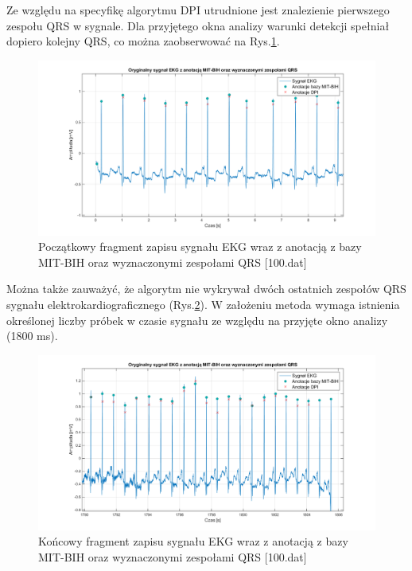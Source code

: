 \documentclass[10pt,a4paper]{article}
\begin{document}
Ze względu na specyfikę algorytmu DPI utrudnione jest znalezienie pierwszego zespołu QRS w sygnale. Dla przyjętego okna analizy warunki detekcji spełniał dopiero kolejny QRS, co można zaobserwować na Rys.\ref{beginning}. 
\begin{figure}[h]
    \centering
    \includegraphics[width=1\textwidth]{img/100_beginning.png}
    \caption{Początkowy fragment zapisu sygnału EKG wraz z anotacją z bazy MIT-BIH oraz wyznaczonymi zespołami QRS [100.dat]}
    \label{beginning}
\end{figure}
\FloatBarrier
Można także zauważyć, że algorytm nie wykrywał dwóch ostatnich zespołów QRS sygnału elektrokardiograficznego (Rys.\ref{ending}). W założeniu metoda wymaga istnienia określonej liczby próbek w czasie sygnału ze względu na przyjęte okno analizy (1800 ms).
\begin{figure}[h]
    \centering
    \includegraphics[width=1\textwidth]{img/100_ending.png}
    \caption{Końcowy fragment zapisu sygnału EKG wraz z anotacją z bazy MIT-BIH oraz wyznaczonymi zespołami QRS [100.dat]}
    \label{ending}
\end{figure}
\FloatBarrier
\end{document}
